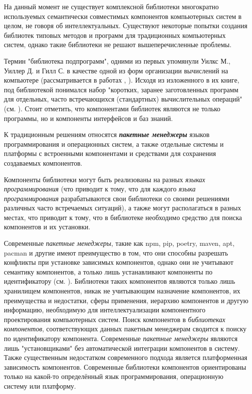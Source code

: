 На данный момент не существует комплексной библиотеки многократно используемых семантически совместимых компонентов компьютерных систем в целом, не говоря об интеллектуальных. Существуют некоторые попытки создания библиотек типовых методов и программ для традиционных компьютерных систем, однако такие библиотеки не решают вышеперечисленные проблемы.

Термин "библиотека подпрограмм"{}, одними из первых упомянули Уилкс М., Уиллер Д. и Гилл С. в качестве одной из форм организации вычислений на компьютере (рассматривается в работах , ). Исходя из изложенного в их книге, под библиотекой понимался набор "коротких, заранее заготовленных программ для отдельных, часто встречающихся (стандартных) вычислительных операций"{} (см. ). Стоит отметить, что компонентами библиотек являются не только программы, но и компоненты интерфейсов и баз знаний.

К традиционным решениям относятся \textbf{\textit{пакетные менеджеры}} языков программирования и операционных систем, а также отдельные системы и платформы с встроенными компонентами и средствами для сохранения создаваемых компонентов.

Компоненты библиотеки могут быть реализованы на разных \textit{языках программирования} (что приводит к тому, что для каждого \textit{языка программирования} разрабатываются свои библиотеки со своими решениями различных часто встречаемых ситуаций), а также могут располагаться в разных местах, что приводит к тому, что в библиотеке необходимо средство для поиска компонентов и их установки.

Современные \textit{пакетные менеджеры}, такие как npm, pip, poetry, maven, apt, pacman и другие имеют преимущество в том, что они способны разрешать конфликты при установке зависимых компонентов, однако они не учитывают семантику компонентов, а только лишь устанавливают компоненты по идентификатору (см. ). Библиотеки таких компонентов являются только лишь хранилищем компонентов, никак не учитывающим назначение компонентов, их преимущества и недостатки, сферы применения, иерархию компонентов и другую информацию, необходимую для интеллектуализации компонентного проектирования компьютерных систем. Поиск компонентов в \textit{библиотеках компонентов}, соответствующих данных пакетным менеджерам сводится к поиску по идентификатору компонента. Современные \textit{пакетные менеджеры} являются лишь "установщиками"{} без автоматической интеграции компонентов в систему. Также существенным недостатком современного подхода является платформенная зависимость компонентов. Современные библиотеки компонентов ориентированы только на какой-то определённый язык программирования, операционную систему или платформу.

